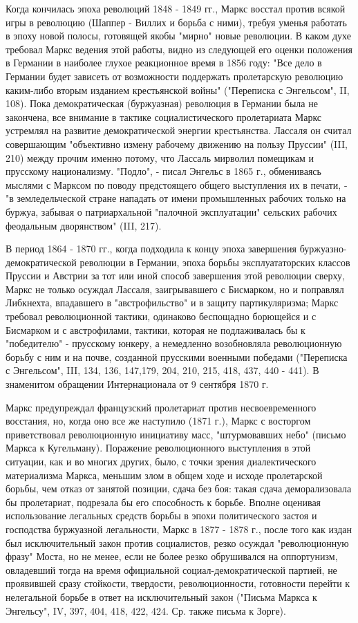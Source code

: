 \documentclass[12pt]{article}
\newcommand{\parnum}{(\arabic{parcount})}
\newcounter{parcount}
\newenvironment{parnumbers}{%
  \par%
  \everypar{\noindent \stepcounter{parcount}\marginpar[]{\parnum}}%
}{}
\begin{document}
\begin{parnumbers}
    Когда кончилась эпоха революций 1848 - 1849 гг., Маркс восстал против всякой игры в революцию (Шаппер - Виллих и борьба с ними), требуя уменья работать в эпоху новой полосы, готовящей якобы "мирно" новые революции. В каком духе требовал Маркс ведения этой работы, видно из следующей его оценки положения в Германии в наиболее глухое реакционное время в 1856 году: "Все дело в Германии будет зависеть от возможности поддержать пролетарскую революцию каким-либо вторым изданием крестьянской войны" ("Переписка с Энгельсом", II, 108). Пока демократическая (буржуазная) революция в Германии была не закончена, все внимание в тактике социалистического пролетариата Маркс устремлял на развитие демократической энергии крестьянства. Лассаля он считал совершающим "объективно измену рабочему движению на пользу Пруссии" (III, 210) между прочим именно потому, что Лассаль мирволил помещикам и прусскому национализму. "Подло", - писал Энгельс в 1865 г., обмениваясь мыслями с Марксом по поводу предстоящего общего выступления их в печати, - "в земледельческой стране нападать от имени промышленных рабочих только на буржуа, забывая о патриархальной "палочной эксплуатации" сельских рабочих феодальным дворянством" (III, 217).

    В период 1864 - 1870 гг., когда подходила к концу эпоха завершения буржуазно-демократической революции в Германии, эпоха борьбы эксплуататорских классов Пруссии и Австрии за тот или иной способ завершения этой революции сверху, Маркс не только осуждал Лассаля, заигрывавшего с Бисмарком, но и поправлял Либкнехта, впадавшего в "австрофильство" и в защиту партикуляризма; Маркс требовал революционной тактики, одинаково беспощадно борющейся и с Бисмарком и с австрофилами, тактики, которая не подлаживалась бы к "победителю" - прусскому юнкеру, а немедленно возобновляла революционную борьбу с ним и на почве, созданной прусскими военными победами ("Переписка с Энгельсом", III, 134, 136, 147,179, 204, 210, 215, 418, 437, 440 - 441). В знаменитом обращении Интернационала от 9 сентября 1870 г.

    Маркс предупреждал французский пролетариат против несвоевременного восстания, но, когда оно все же наступило (1871 г.), Маркс с восторгом приветствовал революционную инициативу масс, "штурмовавших небо" (письмо Маркса к Кугельману). Поражение революционного выступления в этой ситуации, как и во многих других, было, с точки зрения диалектического материализма Маркса, меньшим злом в общем ходе и исходе пролетарской борьбы, чем отказ от занятой позиции, сдача без боя: такая сдача деморализовала бы пролетариат, подрезала бы его способность к борьбе. Вполне оценивая использование легальных средств борьбы в эпохи политического застоя и господства буржуазной легальности, Маркс в 1877 - 1878 г., после того как издан был исключительный закон против социалистов, резко осуждал "революционную фразу" Моста, но не менее, если не более резко обрушивался на оппортунизм, овладевший тогда на время официальной социал-демократической партией, не проявившей сразу стойкости, твердости, революционности, готовности перейти к нелегальной борьбе в ответ на исключительный закон ("Письма Маркса к Энгельсу", IV, 397, 404, 418, 422, 424. Ср. также письма к Зорге).
  \end{parnumbers}
\end{document}
